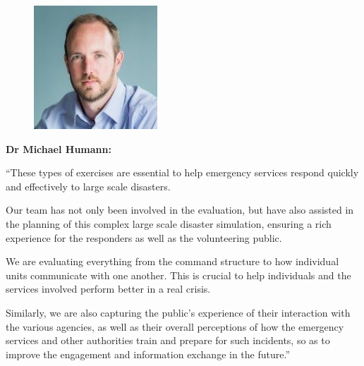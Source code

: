 \documentclass[11pt]{article}%
\begin{document}
\begin{minipage}{.25\linewidth}
\begin{mdframed}[style=about,frametitle={}] %
\begin{figure}[H]
\includegraphics[width=1\linewidth]{lauren/humannProfPic.jpg}
\end{figure}

{\textbf{ Dr Michael Humann:}}

\begin{small}
``These types of exercises are essential to help emergency services respond quickly and effectively to large scale disasters.

Our team has not only been involved in the evaluation, but have also assisted in the planning of this complex large scale disaster simulation, ensuring a rich experience for the responders as well as the volunteering public. 

We are evaluating everything from the command structure to how individual units communicate with one another. This is crucial to help individuals and the services involved perform better in a real crisis. 

Similarly, we are also capturing the public’s experience of their interaction with the various agencies, as well as their overall perceptions of how the emergency services and other authorities train and prepare for such incidents, so as to improve the engagement and information exchange in the future.''


\end{small}
\end{mdframed}
\end{minipage}
\end{document}
